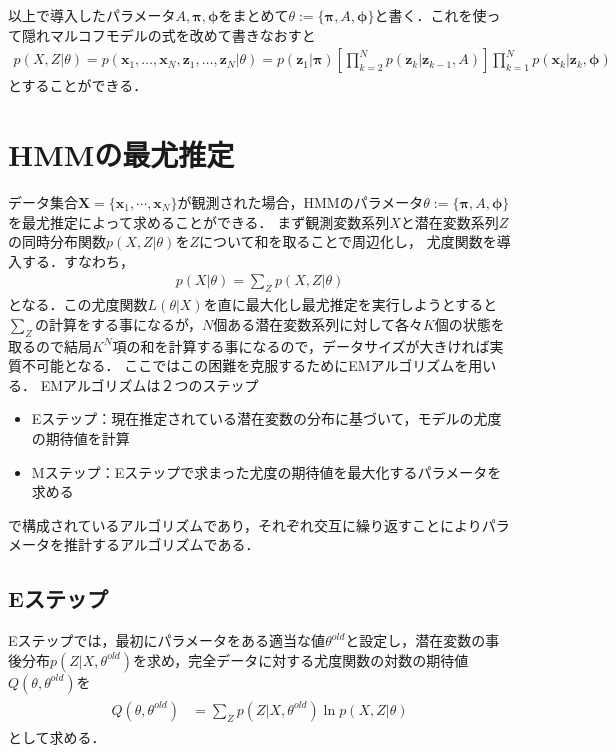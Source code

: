 \documentclass[dvipdfmx,autodetect-engine]{jsreport}
\begin{document}
以上で導入したパラメータ$A,\bm{\pi},\bm{\phi}$をまとめて$\theta := \{\bm{\pi},A,\bm{\phi}\}$と書く．これを使って隠れマルコフモデルの式を改めて書きなおすと
\begin{align}
	p(X,Z|\theta)=p(\bm{x}_1,\dots,\bm{x}_N,\bm{z}_1,\dots,\bm{z}_N|\theta) = p(\bm{z}_1|\bm{\pi}) \left[ \prod_{k=2}^N p(\bm{z}_k|\bm{z}_{k-1},A)\right] \prod_{k=1}^N p(\bm{x}_k|\bm{z}_k,\bm{\phi})
	\label{eq:def_HMM}
\end{align}
とすることができる．

\section{HMMの最尤推定}

データ集合$\bm{X}=\{\bm{x}_1,\cdots,\bm{x}_N\}$が観測された場合，HMMのパラメータ$\theta := \{\bm{\pi},A,\bm{\phi}\}$を最尤推定によって求めることができる．
まず観測変数系列$X$と潜在変数系列$Z$の同時分布関数$p(X,Z|\theta)$を$Z$について和を取ることで周辺化し，
尤度関数を導入する．すなわち，
\begin{align}
	p(X|\theta) = \sum_{Z} p(X,Z|\theta)
	\label{}
\end{align}
となる．この尤度関数$L(\theta|X)$を直に最大化し最尤推定を実行しようとすると$\sum_Z$の計算をする事になるが，$N$個ある潜在変数系列に対して各々$K$個の状態を取るので結局$K^N$項の和を計算する事になるので，データサイズが大きければ実質不可能となる．
ここではこの困難を克服するためにEMアルゴリズムを用いる．
EMアルゴリズムは２つのステップ
\begin{itemize}
    \item Eステップ：現在推定されている潜在変数の分布に基づいて，モデルの尤度の期待値を計算
    \item Mステップ：Eステップで求まった尤度の期待値を最大化するパラメータを求める
    
\end{itemize}
で構成されているアルゴリズムであり，それぞれ交互に繰り返すことによりパラメータを推計するアルゴリズムである．

\subsection{Eステップ}

Eステップでは，最初にパラメータをある適当な値$\theta^{old}$と設定し，潜在変数の事後分布$p(Z|X,\theta^{old})$を求め，完全データに対する尤度関数の対数の期待値$Q(\theta,\theta^{old})$を
\begin{align}
    \begin{aligned}
	    Q(\theta,\theta^{old}) &= \sum_{Z} p(Z|X,\theta^{old}) \ln p(X,Z|\theta)
    \end{aligned}
    \label{eq:def_Q}
\end{align}
として求める．
\end{document}
